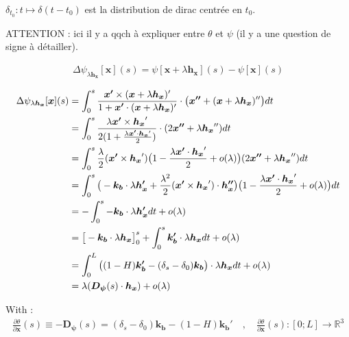 $\delta_{t_0} : t \mapsto \delta(t-t_0)$ est la distribution de dirac centrée en $t_0$.

ATTENTION : ici il y a qqch à expliquer entre $\theta$ et $\psi$ (il y a une question de signe à détailler).

\begin{align}
	\Delta\psi_{\lambda\boldsymbol{h_x}}[\boldsymbol{x}](s) = \psi[\boldsymbol{x} + \lambda\boldsymbol{h_x}](s) - \psi[\boldsymbol{x}](s)
\end{align}

\begin{align}
	\Delta\psi_{\lambda\boldsymbol{h_x}}[\boldsymbol{x}](s) & = \int_{0}^{s} \frac{\boldsymbol{x'} \times (\boldsymbol{x} + \lambda\boldsymbol{h_x})'}{1+ \boldsymbol{x'} \cdot  (\boldsymbol{x} + \lambda\boldsymbol{h_x})'} \cdot \big(\boldsymbol{x''} + (\boldsymbol{x} + \lambda\boldsymbol{h_x})''\big) dt \\
	& = \int_{0}^{s} \frac{\lambda \boldsymbol{x'} \times \boldsymbol{h_x}'}{2(1+ \frac{\lambda \boldsymbol{x'} \cdot \boldsymbol{h_x}'}{2})} \cdot (2\boldsymbol{x''} + \lambda\boldsymbol{h_x}'') dt \notag\\
	& = \int_{0}^{s} \frac{\lambda}{2}(\boldsymbol{x'} \times \boldsymbol{h_x}')\big(1- \frac{\lambda \boldsymbol{x'} \cdot \boldsymbol{h_x}'}{2} + o(\lambda)\big)(2\boldsymbol{x''} + \lambda\boldsymbol{h_x}'') dt \notag\\
	& = \int_{0}^{s} \big(-\boldsymbol{k_b} \cdot \lambda \boldsymbol{h_x'} + \frac{\lambda^2}{2}(\boldsymbol{x'} \times \boldsymbol{h_x}')\cdot\boldsymbol{h_x''}\big)\big(1- \frac{\lambda \boldsymbol{x'} \cdot \boldsymbol{h_x}'}{2} + o(\lambda)\big) dt \notag\\
	& = - \int_{0}^{s} -\boldsymbol{k_b} \cdot \lambda \boldsymbol{h_x'}dt +o(\lambda) \notag\\
	& = \big[-\boldsymbol{k_b} \cdot \lambda \boldsymbol{h_x}\big]_{0}^{s} + \int_{0}^{s} \boldsymbol{k_b'} \cdot \lambda \boldsymbol{h_x}dt +o(\lambda) \notag\\
	& = \int_{0}^{L} \big((1-H)\boldsymbol{k_b'} - (\delta_s - \delta_0)\boldsymbol{k_b}\big)\cdot\lambda \boldsymbol{h_x}dt +o(\lambda) \notag\\
	& = \lambda(\boldsymbol{D_{\psi}}(s)\cdot\boldsymbol{h_x}) + o(\lambda)\notag
\end{align}

With :
\begin{align}
	\frac{\partial \theta}{\partial \boldsymbol{x}}(s) \equiv -\boldsymbol{D_{\psi}}(s) = (\delta_s - \delta_0)\boldsymbol{k_b} - (1-H)\boldsymbol{k_b'}
	\quad , \quad \frac{\partial \theta}{\partial \boldsymbol{x}}(s) : [0;L] \longrightarrow \mathbb{R}^3
\end{align}



